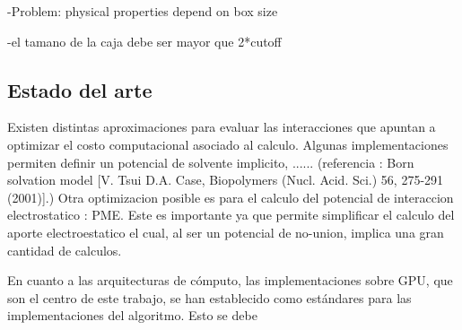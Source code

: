 \documentclass[a4paper,10pt]{report}
\begin{document}
-Problem: physical properties depend on box size

-el tamano de la caja debe ser mayor que 2*cutoff






%  



\subsection{Estado del arte}


Existen distintas aproximaciones para evaluar las interacciones que apuntan a optimizar el costo computacional asociado al calculo. Algunas implementaciones permiten definir un potencial de solvente implicito, ...... (referencia : Born solvation model [V. Tsui  D.A. Case, Biopolymers (Nucl. Acid. Sci.) 56, 275-291 (2001)].)
Otra optimizacion posible es para el calculo del potencial de interaccion electrostatico : PME. Este es importante ya que permite simplificar el calculo del aporte electroestatico el cual, al ser un potencial de no-union, implica una gran cantidad de calculos.






En cuanto a las arquitecturas de cómputo, las implementaciones sobre GPU, que son el centro de este trabajo, se han establecido como estándares para las implementaciones del algoritmo. Esto se debe 
\end{document}
